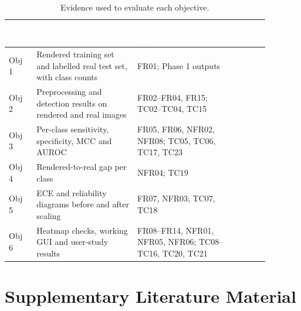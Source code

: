 \documentclass[12pt,nonacm,acmlarge,titlepage,screen]{acmart}
\begin{document}
\begin{table}[H]
  \centering
  \footnotesize
  \setlength{\arrayrulewidth}{0.8pt}
  \renewcommand{\arraystretch}{1.12}
  \caption{Evidence used to evaluate each objective.}
  \label{tab:obj-eval}
  \begin{tabular}{|P{0.07\linewidth}|P{0.36\linewidth}|P{0.34\linewidth}|P{0.11\linewidth}|}
    \hline
    \textcolor{white}{\textbf{Obj.}} & \textcolor{white}{\textbf{Evidence}} &
    \textcolor{white}{\textbf{Requirements and tests}} & \textcolor{white}{\textbf{Status}} \\
    \hline
    Obj 1 & Rendered training set and labelled real test set, with class counts & FR01; Phase 1 outputs & \\
    \hline
    Obj 2 & Preprocessing and detection results on rendered and real images & FR02--FR04, FR15; TC02--TC04, TC15 & \\
    \hline
    Obj 3 & Per-class sensitivity, specificity, MCC and AUROC & FR05, FR06, NFR02, NFR08; TC05, TC06, TC17, TC23 & \\
    \hline
    Obj 4 & Rendered-to-real gap per class & NFR04; TC19 & \\
    \hline
    Obj 5 & ECE and reliability diagrams before and after scaling & FR07, NFR03; TC07, TC18 & \\
    \hline
    Obj 6 & Heatmap checks, working GUI and user-study results & FR08--FR14, NFR01, NFR05, NFR06; TC08--TC16, TC20, TC21 & \\
    \hline
  \end{tabular}
\end{table}


\section{Supplementary Literature Material}
\label{app:lit}
\end{document}
